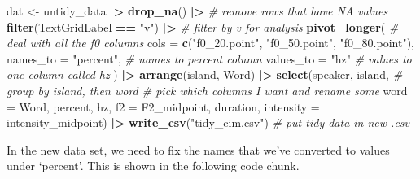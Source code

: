 \documentclass[
  ,man,floatsintext]{apa6}
\newenvironment{Shaded}{\begin{snugshade}}{\end{snugshade}}
\newcommand{\AttributeTok}[1]{\textcolor[rgb]{0.13,0.29,0.53}{#1}}
\newcommand{\CommentTok}[1]{\textcolor[rgb]{0.56,0.35,0.01}{\textit{#1}}}
\newcommand{\FunctionTok}[1]{\textcolor[rgb]{0.13,0.29,0.53}{\textbf{#1}}}
\newcommand{\NormalTok}[1]{#1}
\newcommand{\OtherTok}[1]{\textcolor[rgb]{0.56,0.35,0.01}{#1}}
\newcommand{\SpecialCharTok}[1]{\textcolor[rgb]{0.81,0.36,0.00}{\textbf{#1}}}
\newcommand{\StringTok}[1]{\textcolor[rgb]{0.31,0.60,0.02}{#1}}
\begin{document}
\begin{Shaded}
\begin{Highlighting}[]
\NormalTok{dat }\OtherTok{\textless{}{-}}\NormalTok{ untidy\_data }\SpecialCharTok{|\textgreater{}}
  \FunctionTok{drop\_na}\NormalTok{() }\SpecialCharTok{|\textgreater{}}   \CommentTok{\# remove rows that have NA values}
  \FunctionTok{filter}\NormalTok{(TextGridLabel }\SpecialCharTok{==} \StringTok{"v"}\NormalTok{) }\SpecialCharTok{|\textgreater{}}   \CommentTok{\# filter by \textquotesingle{}v\textquotesingle{} for analysis}
  \FunctionTok{pivot\_longer}\NormalTok{(      }\CommentTok{\# deal with all the f0 columns}
    \AttributeTok{cols =} \FunctionTok{c}\NormalTok{(}\StringTok{"f0\_20.point"}\NormalTok{, }
             \StringTok{"f0\_50.point"}\NormalTok{, }
             \StringTok{"f0\_80.point"}\NormalTok{),}
    \AttributeTok{names\_to =} \StringTok{"percent"}\NormalTok{,    }\CommentTok{\# names to \textquotesingle{}percent\textquotesingle{} column}
    \AttributeTok{values\_to =} \StringTok{"hz"}      \CommentTok{\# values to one column called \textquotesingle{}hz\textquotesingle{}}
\NormalTok{  ) }\SpecialCharTok{|\textgreater{}}
  \FunctionTok{arrange}\NormalTok{(island, Word) }\SpecialCharTok{|\textgreater{}}  
  \FunctionTok{select}\NormalTok{(speaker, island,   }\CommentTok{\# group by \textquotesingle{}island\textquotesingle{}, then \textquotesingle{}word\textquotesingle{}    \# pick which columns I want and rename some}
         \AttributeTok{word =}\NormalTok{ Word, }
\NormalTok{         percent, hz, }\AttributeTok{f2 =}\NormalTok{ F2\_midpoint, duration, }
         \AttributeTok{intensity =}\NormalTok{ intensity\_midpoint) }\SpecialCharTok{|\textgreater{}}
  \FunctionTok{write\_csv}\NormalTok{(}\StringTok{"tidy\_cim.csv"}\NormalTok{)    }\CommentTok{\# put tidy data in new .csv}
\end{Highlighting}
\end{Shaded}

In the new data set, we need to fix the names that we've converted to values under `percent'. This is shown in the following code chunk.

\begin{Shaded}
\end{Shaded}
\end{document}
